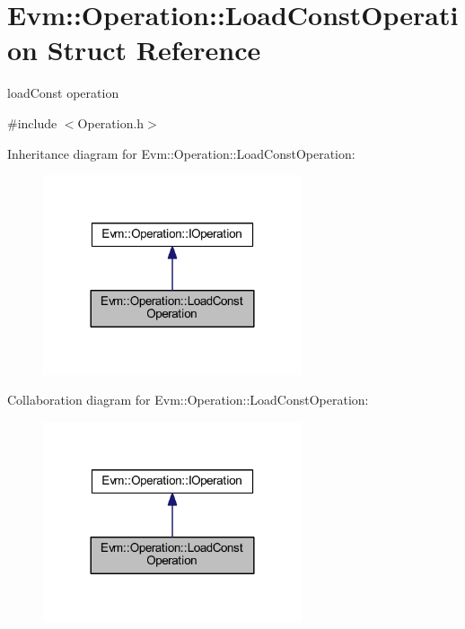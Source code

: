 \hypertarget{struct_evm_1_1_operation_1_1_load_const_operation}{}\section{Evm\+:\+:Operation\+:\+:Load\+Const\+Operation Struct Reference}
\label{struct_evm_1_1_operation_1_1_load_const_operation}


load\+Const operation  




{\ttfamily \#include $<$Operation.\+h$>$}



Inheritance diagram for Evm\+:\+:Operation\+:\+:Load\+Const\+Operation\+:
\nopagebreak
\begin{figure}[H]
\begin{center}
\leavevmode
\includegraphics[width=216pt]{struct_evm_1_1_operation_1_1_load_const_operation__inherit__graph}
\end{center}
\end{figure}


Collaboration diagram for Evm\+:\+:Operation\+:\+:Load\+Const\+Operation\+:
\nopagebreak
\begin{figure}[H]
\begin{center}
\leavevmode
\includegraphics[width=216pt]{struct_evm_1_1_operation_1_1_load_const_operation__coll__graph}
\end{center}
\end{figure}
